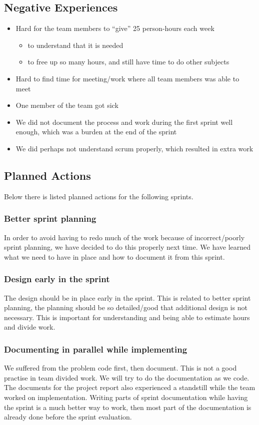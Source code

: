 \subsection{Negative Experiences}
\begin{itemize}
	\item Hard for the team members to “give” 25 person-hours each week
	\begin{itemize}
		\item to understand that it is needed
		\item to free up so many hours, and still have time to do other subjects
	\end{itemize}
	\item Hard to find time for meeting/work where all team members was able to meet
	\item One member of the team got sick
	\item We did not document the process and work during the first sprint well enough, which was a burden at the end of the sprint
	\item We did perhaps not understand scrum properly, which resulted in extra work
\end{itemize}
\subsection{Planned Actions}
Below there is listed planned actions for the following sprints.

\subsubsection{Better sprint planning}
In order to avoid having to redo much of the work because of incorrect/poorly sprint planning, we have decided to do this properly next time. We have learned what we need to have in place and how to document it from this sprint.

\subsubsection{Design early in the sprint} 
The design should be in place early in the sprint. This is related to better sprint planning, the planning should be so detailed/good that additional design is not necessary. This is important for understanding and being able to estimate hours and divide work.

\subsubsection{Documenting in parallel while implementing}
We suffered from the problem code first, then document. This is not a good practise in team divided work. We will try to do the documentation as we code.
The documents for the project report also experienced a standstill while the team worked on implementation. Writing parts of sprint documentation while having the sprint is a much better way to work, then most part of the documentation is already done before the sprint evaluation.

